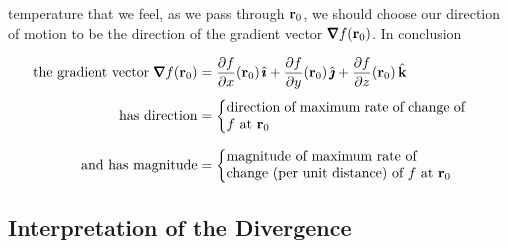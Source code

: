 temperature that we feel, as we pass through $\mathbf{r}_0$, we should
choose our direction of motion 
to be the direction of the gradient vector $\vnabla f(\vr_0)$.
In conclusion
\begin{impeqn}\label{eq:gradInterp}
\begin{align*}
\text{the gradient vector }\vnabla f(\vr_0) &=
    \frac{\partial f}{\partial x}(\vr_0)\,\hi
          +\frac{\partial f}{\partial y}(\vr_0)\,\hj
          +\frac{\partial f}{\partial z}(\vr_0)\,\hk \\[0.05in]
\quad\text{has direction}&=\left\{
       \parbox[c]{6.0cm}{direction of maximum rate
                           of change of $f$ at $\vr_0$}
                           \right. \\[0.1in]
\text{and has magnitude}&=\left\{
       \parbox[c]{6.5cm}{magnitude of maximum rate of\\
                          change (per unit distance) of $f$ at $\vr_0$}
                           \right.
\end{align*}
\end{impeqn}





\subsection{Interpretation of the Divergence}\label{sec:divInterp}

